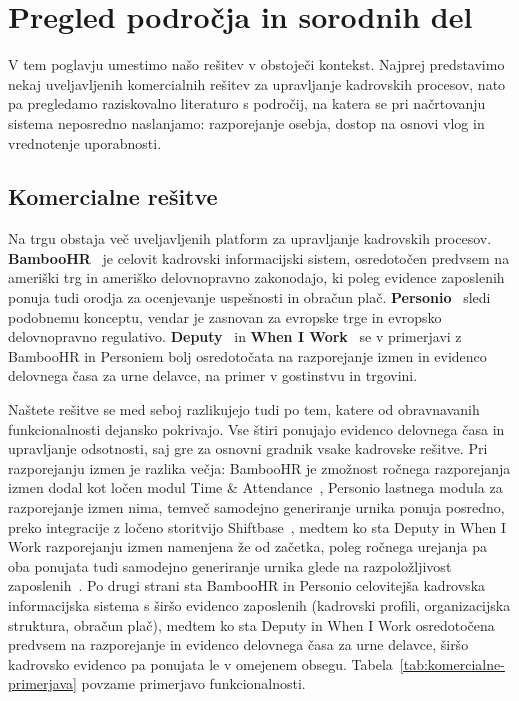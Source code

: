\chapter{Pregled področja in sorodnih del}
\label{ch:sorodna}

V tem poglavju umestimo našo rešitev v obstoječi kontekst. Najprej predstavimo nekaj uveljavljenih komercialnih rešitev za upravljanje kadrovskih procesov, nato pa pregledamo raziskovalno literaturo s področij, na katera se pri načrtovanju sistema neposredno naslanjamo: razporejanje osebja, dostop na osnovi vlog in vrednotenje uporabnosti.

\section{Komercialne rešitve}
\label{sec:komercialne-resitve}

Na trgu obstaja več uveljavljenih platform za upravljanje kadrovskih procesov. \textbf{BambooHR}~\cite{bamboohr} je celovit kadrovski informacijski sistem, osredotočen predvsem na ameriški trg in ameriško delovnopravno zakonodajo, ki poleg evidence zaposlenih ponuja tudi orodja za ocenjevanje uspešnosti in obračun plač. \textbf{Personio}~\cite{personio} sledi podobnemu konceptu, vendar je zasnovan za evropske trge in evropsko delovnopravno regulativo. \textbf{Deputy}~\cite{deputy} in \textbf{When I Work}~\cite{wheniwork} se v primerjavi z BambooHR in Personiem bolj osredotočata na razporejanje izmen in evidenco delovnega časa za urne delavce, na primer v gostinstvu in trgovini.

Naštete rešitve se med seboj razlikujejo tudi po tem, katere od obravnavanih funkcionalnosti dejansko pokrivajo. Vse štiri ponujajo evidenco delovnega časa in upravljanje odsotnosti, saj gre za osnovni gradnik vsake kadrovske rešitve. Pri razporejanju izmen je razlika večja: BambooHR je zmožnost ročnega razporejanja izmen dodal kot ločen modul Time \& Attendance~\cite{bamboohr}, Personio lastnega modula za razporejanje izmen nima, temveč samodejno generiranje urnika ponuja posredno, preko integracije z ločeno storitvijo Shiftbase~\cite{personio}, medtem ko sta Deputy in When I Work razporejanju izmen namenjena že od začetka, poleg ročnega urejanja pa oba ponujata tudi samodejno generiranje urnika glede na razpoložljivost zaposlenih~\cite{deputy,wheniwork}. Po drugi strani sta Bamboo\-HR in Personio celovitejša kadrovska informacijska sistema s širšo evidenco zaposlenih (kadrovski profili, organizacijska struktura, obračun plač), medtem ko sta Deputy in When I Work osredotočena predvsem na razporejanje in evidenco delovnega časa za urne delavce, širšo kadrovsko evidenco pa ponujata le v omejenem obsegu. Tabela~\ref{tab:komercialne-primerjava} povzame primerjavo funkcionalnosti.

